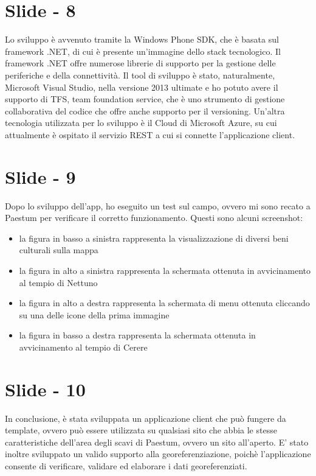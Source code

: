 \documentclass[12pt]{article}
\begin{document}
\section{Slide - 8}
Lo sviluppo è avvenuto tramite la Windows Phone SDK, che è basata sul framework .NET, di cui è presente un'immagine dello stack tecnologico. Il framework .NET offre numerose librerie di supporto per la gestione delle periferiche e della connettività. 
Il tool di sviluppo è stato, naturalmente, Microsoft Visual Studio, nella versione 2013 ultimate e ho potuto avere il supporto di TFS, team foundation service, che è uno strumento di gestione collaborativa del codice che offre anche supporto per il versioning.
Un'altra tecnologia utilizzata per lo sviluppo è il Cloud di Microsoft Azure, su cui attualmente è ospitato il servizio REST a cui si connette l'applicazione client.

\section{Slide - 9}
Dopo lo sviluppo dell'app, ho eseguito un test sul campo, ovvero mi sono recato a Paestum per verificare il corretto funzionamento.
Questi sono alcuni screenshot:
\begin{itemize}
\item la figura in basso a sinistra rappresenta la visualizzazione di diversi beni culturali sulla mappa
\item la figura in alto a sinistra rappresenta la schermata ottenuta in avvicinamento al tempio di Nettuno
\item la figura in alto a destra rappresenta la schermata di menu ottenuta cliccando su una delle icone della prima immagine
\item la figura in basso a destra rappresenta la schermata ottenuta in avvicinamento al tempio di Cerere
\end{itemize}

\section{Slide - 10}
In conclusione, è stata sviluppata un applicazione client che può fungere da template, ovvero può essere utilizzata su qualsiasi sito che abbia le stesse caratteristiche dell'area degli scavi di Paestum, ovvero un sito all'aperto.
E' stato inoltre sviluppato un valido supporto alla georeferenziazione, poichè l'applicazione consente di verificare, validare ed elaborare i dati georeferenziati.
\end{document}
